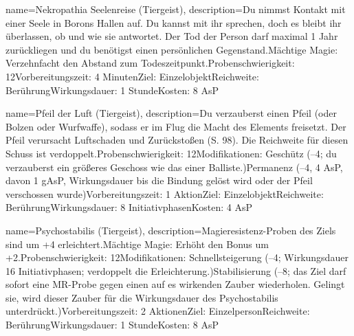 {
    name={Nekropathia Seelenreise (Tiergeist)},
    description={Du nimmst Kontakt mit einer Seele in Borons Hallen auf. Du kannst mit ihr sprechen, doch es bleibt ihr überlassen, ob und wie sie antwortet. Der Tod der Person darf maximal 1 Jahr zurückliegen und du benötigst einen persönlichen Gegenstand.\newline Mächtige Magie: Verzehnfacht den Abstand zum Todeszeitpunkt.\newline Probenschwierigkeit: 12\newline Vorbereitungszeit: 4 Minuten\newline Ziel: Einzelobjekt\newline Reichweite: Berührung\newline Wirkungsdauer: 1 Stunde\newline Kosten: 8 AsP}
}


{
    name={Pfeil der Luft (Tiergeist)},
    description={Du verzauberst einen Pfeil (oder Bolzen oder Wurfwaffe), sodass er im Flug die Macht des Elements freisetzt. Der Pfeil verursacht Luftschaden und Zurückstoßen (S. 98). Die Reichweite für diesen Schuss ist verdoppelt.\newline Probenschwierigkeit: 12\newline Modifikationen: Geschütz (–4; du verzauberst ein größeres Geschoss wie das einer Balliste.)\newline Permanenz (–4, 4 AsP, davon 1 gAsP, Wirkungsdauer bis die Bindung gelöst wird oder der Pfeil verschossen wurde)\newline Vorbereitungszeit: 1 Aktion\newline Ziel: Einzelobjekt\newline Reichweite: Berührung\newline Wirkungsdauer: 8 Initiativphasen\newline Kosten: 4 AsP}
}


{
    name={Psychostabilis (Tiergeist)},
    description={Magieresistenz-Proben des Ziels sind um +4 erleichtert.\newline Mächtige Magie: Erhöht den Bonus um +2.\newline Probenschwierigkeit: 12\newline Modifikationen: Schnellsteigerung (–4; Wirkungsdauer 16 Initiativphasen; verdoppelt die Erleichterung.)\newline Stabilisierung (–8; das Ziel darf sofort eine MR-Probe gegen einen auf es wirkenden Zauber wiederholen. Gelingt sie, wird dieser Zauber für die Wirkungsdauer des Psychostabilis unterdrückt.)\newline Vorbereitungszeit: 2 Aktionen\newline Ziel: Einzelperson\newline Reichweite: Berührung\newline Wirkungsdauer: 1 Stunde\newline Kosten: 8 AsP}
}


